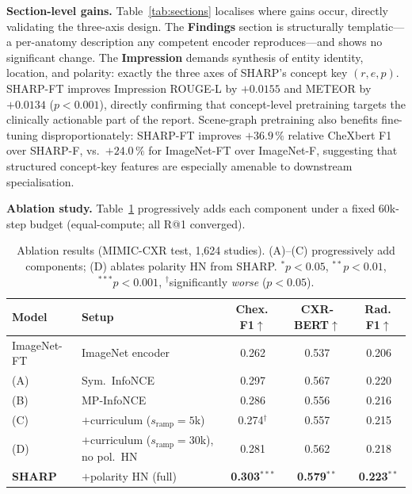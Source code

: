 \documentclass[runningheads]{llncs}
\begin{document}
\noindent\textbf{Section-level gains.}
Table~\ref{tab:sections} localises where gains occur, directly
validating the three-axis design.
The \textbf{Findings} section is structurally templatic---a per-anatomy
description any competent encoder reproduces---and shows no significant
change.
The \textbf{Impression} demands synthesis of entity identity, location,
and polarity: exactly the three axes of SHARP's concept key $(r, e, p)$.
SHARP-FT improves Impression ROUGE-L by $+0.0155$ and METEOR by $+0.0134$
($p{<}0.001$), directly confirming that concept-level pretraining
targets the clinically actionable part of the report.
Scene-graph pretraining also benefits fine-tuning disproportionately:
SHARP-FT improves $+36.9\,\%$ relative CheXbert F1 over SHARP-F,
vs.\ $+24.0\,\%$ for ImageNet-FT over ImageNet-F, suggesting that
structured concept-key features are especially amenable to downstream
specialisation.

\noindent\textbf{Ablation study.}
Table~\ref{tab:ablation} progressively adds each component under a
fixed 60k-step budget (equal-compute; all R@1 converged).

\begin{table}[t]
\centering
\caption{Ablation results (MIMIC-CXR test, 1,624 studies).
         (A)--(C) progressively add components; (D) ablates polarity HN from SHARP.
         $^{*}p{<}0.05$, $^{**}p{<}0.01$, $^{***}p{<}0.001$,
         $^{\dagger}$significantly \emph{worse} ($p{<}0.05$).}
\label{tab:ablation}
\small\setlength{\tabcolsep}{4pt}%
\begin{tabular}{lp{3.0cm}ccc}
\toprule
\textbf{Model} & \textbf{Setup} &
\textbf{Chex.\,F1}$\uparrow$ & \textbf{CXR-BERT}$\uparrow$ & \textbf{Rad.\,F1}$\uparrow$ \\
\midrule
ImageNet-FT    & ImageNet encoder              & 0.262 & 0.537 & 0.206 \\
\midrule
(A)            & Sym.\ InfoNCE                 & 0.297 & 0.567 & 0.220 \\
(B)            & MP-InfoNCE                    & 0.286 & 0.556 & 0.216 \\
(C)            & $+$curriculum ($s_\mathrm{ramp}{=}5$k)    & 0.274$^{\dagger}$ & 0.557 & 0.215 \\
(D)            & $+$curriculum ($s_\mathrm{ramp}{=}30$k), no pol.\ HN & 0.281 & 0.562 & 0.218 \\
\textbf{SHARP} & $+$polarity HN (full)         & \textbf{0.303}$^{***}$ & \textbf{0.579}$^{**}$ & \textbf{0.223}$^{**}$ \\
\bottomrule
\end{tabular}
\end{table}
\end{document}
